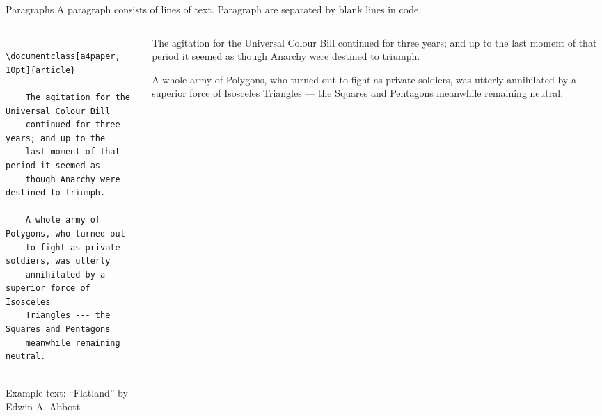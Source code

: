 \copyrightTim

\begin{frame}[fragile, t]{Paragraphs}
	A paragraph consists of lines of text. Paragraph are separated by blank lines in code.\newline
	\begin{columns}[t]
        \begin{column}{0.5\textwidth}
	\begin{verbatim} 
	\documentclass[a4paper, 10pt]{article}
	
	The agitation for the Universal Colour Bill 
	continued for three years; and up to the 
	last moment of that period it seemed as 
	though Anarchy were destined to triumph.

	A whole army of Polygons, who turned out 
	to fight as private soldiers, was utterly 
	annihilated by a superior force of Isosceles 
	Triangles --- the Squares and Pentagons 
	meanwhile remaining neutral.
	
	\end{verbatim}
	{\tiny
	Example text: ``Flatland''
	by Edwin A. Abbott
	}\par
	\end{column}
	\begin{column}{0.5\textwidth}
	\vspace{0pt}
	\begin{tcolorbox}\small \setlength\parindent{20pt}
	The agitation for the Universal Colour Bill continued for three years; 
	and up to the last moment of that period it seemed as though Anarchy 
	were destined to triumph.

	A whole army of Polygons, who turned out to fight as private soldiers, 
	was utterly annihilated by a superior force of Isosceles 
	Triangles --- the Squares and Pentagons meanwhile remaining neutral.
	\end{tcolorbox}
\end{column}
\end{columns}

\end{frame}